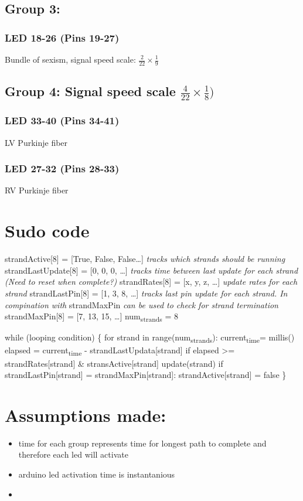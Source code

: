 \documentclass[11pt]{article}
\begin{document}
\subsection{Group 3:}
\label{sec:org2c09e79}
\subsubsection{LED 18-26 (Pins 19-27)}
\label{sec:orgd17c996}
Bundle of sexism, signal speed scale: \(\frac{2}{22} \times \frac{1}{9}\)
\subsection{Group 4: Signal speed scale \(\frac{4}{22} \times \frac{1}{8})\)}
\label{sec:org0116218}
\subsubsection{LED 33-40 (Pins 34-41)}
\label{sec:org8691df1}
LV Purkinje fiber
\subsubsection{LED 27-32 (Pins 28-33)}
\label{sec:org34cd8ef}
RV Purkinje fiber




\section{Sudo code}
\label{sec:org6d70adb}

strandActive[8] = [True, False, False\ldots{}]
\emph{tracks which strands should be running}
strandLastUpdate[8] = [0, 0, 0, \ldots{}]
\emph{tracks time between last update for each strand (Need to reset when complete?)}
strandRates[8] = [x, y, z, \ldots{}]
\emph{update rates for each strand}
strandLastPin[8] = [1, 3, 8, \ldots{}]
\emph{tracks last pin update for each strand. In compination with} strandMaxPin \emph{can be used to check for strand termination}
strandMaxPin[8] = [7, 13, 15, \ldots{}]
num\textsubscript{strands} = 8

while (looping condition) \{
    for strand in range(num\textsubscript{strands}):
        current\textsubscript{time}= millis()
        elapsed = current\textsubscript{time} - strandLastUpdata[strand]
        if elapsed >= strandRates[strand] \& stransActive[strand]
            update(strand)
            if strandLastPin[strand] = strandMaxPin[strand]:
                strandActive[strand] = false
\}


\section{Assumptions made:}
\label{sec:orgc3f06b4}
\begin{itemize}
\item time for each group represents time for longest path to complete
and therefore each led will activate
\item arduino led activation time is instantanious
\item 
\end{itemize}
\end{document}
